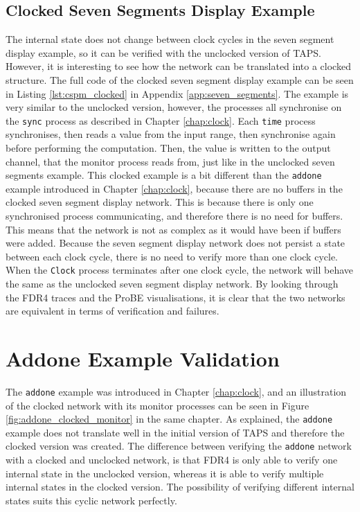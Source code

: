 \subsection{Clocked Seven Segments Display Example}
The internal state does not change between clock cycles in the seven segment display example, so it can be verified with the unclocked version of TAPS. However, it is interesting to see how the network can be translated into a clocked structure. The full \cspm{} code of the clocked seven segment display example can be seen in Listing \ref{lst:cspm_clocked} in Appendix \ref{app:seven_segments}.
The example is very similar to the unclocked version, however, the processes all synchronise on the \texttt{sync} process as described in Chapter \ref{chap:clock}. Each \texttt{time} process synchronises, then reads a value from the input range, then synchronise again before performing the computation. Then, the value is written to the output channel, that the monitor process reads from, just like in the unclocked seven segments example. This clocked example is a bit different than the \texttt{addone} example introduced in Chapter \ref{chap:clock}, because there are no buffers in the clocked seven segment display network. This is because there is only one synchronised process communicating, and therefore there is no need for buffers. This means that the network is not as complex as it would have been if buffers were added.
Because the seven segment display network does not persist a state between each clock cycle, there is no need to verify more than one clock cycle. When the \texttt{Clock} process terminates after one clock cycle, the network will behave the same as the unclocked seven segment display network. By looking through the FDR4 traces and the ProBE visualisations, it is clear that the two networks are equivalent in terms of verification and failures.
\section{Addone Example Validation}
The \texttt{addone} example was introduced in Chapter \ref{chap:clock}, and an illustration of the clocked network with its monitor processes can be seen in Figure \ref{fig:addone_clocked_monitor} in the same chapter. As explained, the \texttt{addone} example does not translate well in the initial version of TAPS and therefore the clocked version was created.
The difference between verifying the \texttt{addone} network with a clocked and unclocked network, is that FDR4 is only able to verify one internal state in the unclocked version, whereas it is able to verify multiple internal states in the clocked version. The possibility of verifying different internal states suits this cyclic network perfectly.\\


